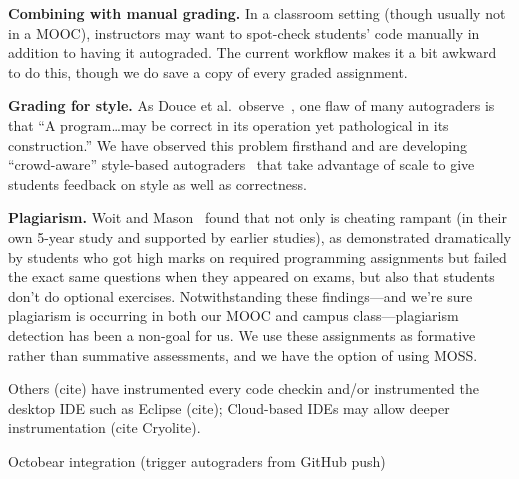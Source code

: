 \textbf{Combining with manual grading.}  In a classroom setting (though
usually not in a MOOC), instructors may want to
spot-check students' code manually  in addition to having it
autograded.  The current workflow makes it a  bit awkward to do this,
though we do save a copy of every graded assignment.

\textbf{Grading for style.}
As Douce et al.\ observe~\cite{douce-2005-autograding-survey}, one flaw
of many autograders is that ``A program\ldots{}may be correct in its
operation yet pathological in its construction.''
We have observed this problem firsthand and are developing
``crowd-aware'' style-based
autograders~\cite{autostyle,clustering-style} that take advantage of
scale to give students feedback on style as well as correctness.  

\textbf{Plagiarism.}
Woit and Mason~\cite{woit2003} found that not only is cheating rampant
(in their own 5-year study and supported by earlier studies), as
demonstrated dramatically by students who got high marks on required
programming assignments but failed the exact same questions when they
appeared on exams, but also that students don't do optional exercises.
Notwithstanding these findings---and we're sure plagiarism is occurring
in both our MOOC and campus class---plagiarism detection has been a
non-goal for us.  We use these assignments as formative rather than
summative assessments, and we have the option of using
MOSS.

Others (cite) have instrumented every code checkin and/or instrumented the desktop IDE  such as Eclipse (cite); Cloud-based IDEs may allow deeper instrumentation (cite Cryolite).

Octobear integration (trigger autograders from GitHub push)
